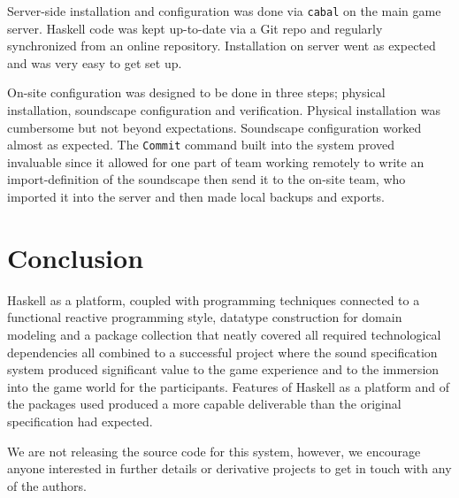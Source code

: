 Server-side installation and configuration was done via \texttt{cabal} on the main game server. Haskell code was kept up-to-date via a Git repo and regularly synchronized from an online repository. Installation on server went as expected and was very easy to get set up. 

On-site configuration was designed to be done in three steps; physical
installation, soundscape configuration and verification. Physical
installation was cumbersome but not beyond expectations. Soundscape
configuration worked almost as expected. The \texttt{Commit} command built into the system proved invaluable since it allowed for one part of team working remotely to write an import-definition of the soundscape then send it to the on-site team, who imported it into the server and then made local backups and exports.

\section{Conclusion}
\label{sec:conclusion}

Haskell as a platform, coupled with programming techniques connected
to a functional reactive programming style, datatype construction
for domain modeling and a package collection that neatly covered all
required technological dependencies all combined to a successful
project where the sound specification system produced significant
value to the game experience and to the immersion into the game world
for the participants. Features of Haskell as a platform and of the
packages used produced a more capable deliverable than the original
specification had expected.

We are not releasing the source code for this system, however,
we encourage anyone interested in further details or derivative
projects to get in touch with any of the authors.


